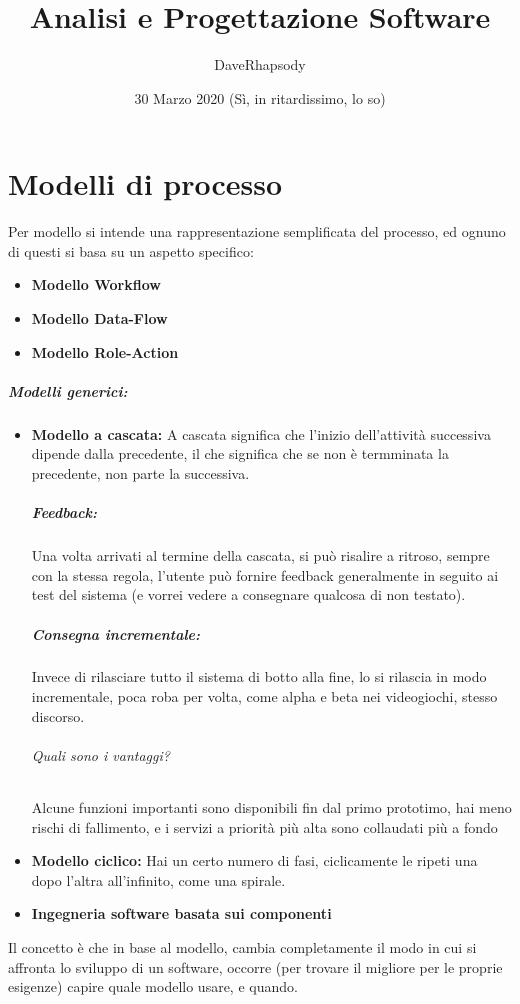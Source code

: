 \documentclass[12pt, a4paper, openany, twoside]{book}
\begin{document}
\selectfont
\pagestyle{plain}
\author{DaveRhapsody}
\title {Analisi e Progettazione Software}
\date {30 Marzo 2020 (Sì, in ritardissimo, lo so)}
\maketitle
\tableofcontents
\chapter{Modelli di processo}
Per modello si intende una rappresentazione semplificata del processo, ed ognuno
di questi si basa su un aspetto specifico: 
\begin{itemize}
 	\item \textbf{Modello Workflow}
 	\item \textbf{Modello Data-Flow}
 	\item \textbf{Modello Role-Action}
 \end{itemize} 
 \paragraph{Modelli generici:}
 \begin{itemize}
 	\item \textbf{Modello a cascata:} A cascata significa che l'inizio dell'attività
 	successiva dipende dalla precedente, il che significa che se non è termminata
 	la precedente, non parte la successiva. 
 	\paragraph{Feedback:} Una volta arrivati al termine della cascata, si può
 	risalire a ritroso, sempre con la stessa regola, l'utente può fornire feedback
 	generalmente in seguito ai test del sistema (e vorrei vedere a consegnare
 	qualcosa di non testato).
 	\paragraph{Consegna incrementale:} Invece di rilasciare tutto il sistema di
 	botto alla fine, lo si rilascia in modo incrementale, poca roba per volta,
 	come alpha e beta nei videogiochi, stesso discorso. 
 	\subparagraph{Quali sono i vantaggi?} Alcune funzioni importanti sono disponibili
 	fin dal primo prototimo, hai meno rischi di fallimento, e i servizi a priorità
 	più alta sono collaudati più a fondo 	
 	\item \textbf{Modello ciclico:} Hai un certo numero di fasi, ciclicamente
 	le ripeti una dopo l'altra all'infinito, come una spirale.
 	\item \textbf{Ingegneria software basata sui componenti}
 \end{itemize}
Il concetto è che in base al modello, cambia completamente il modo in cui si
affronta lo sviluppo di un software, occorre (per trovare il migliore per le
proprie esigenze) capire quale modello usare, e quando.
\end{document}

